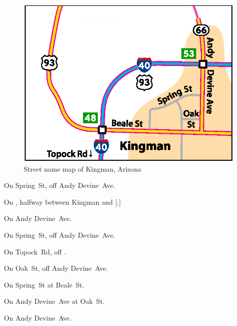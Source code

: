
\begin{figure}[b!]
\includegraphics[scale=0.77]{cities/arizona/kingman}
\centering\caption{Street name map of Kingman, Arizona}
\end{figure}

\begin{LocationList}

On Spring~St, off Andy Devine~Ave.

On , halfway between Kingman and [.]

On  Andy Devine~Ave.

\Location{\GasStation \Gas}
On Spring~St, off Andy Devine~Ave.

On Topock~Rd, off  .

On Oak~St, off Andy Devine~Ave.

On Spring~St at Beale~St.

\Location{\TruckService \Service \Rest}
On Andy Devine~Ave at Oak~St.

On  Andy Devine~Ave.

\end{LocationList}
